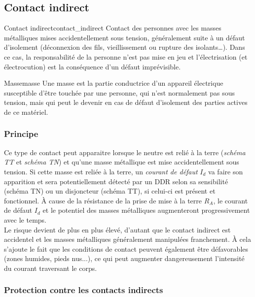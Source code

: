 \documentclass[a4paper, 11pt, twoside, fleqn]{memoir}
\begin{document}
\subsection{Contact indirect}

\begin{definition}{Contact indirect}{contact_indirect}
Contact des personnes avec les masses métalliques mises accidentellement sous tension, généralement suite à un défaut d'isolement (déconnexion des fils, vieillissement ou rupture des isolants\ldots). Dans ce cas, la responsabilité de la personne n'est pas mise en jeu et l'électrisation (et électrocution) est la conséquence d'un défaut imprévisible.
\end{definition}
\begin{definition}{Masse}{masse}
Une masse est la partie conductrice d'un appareil électrique susceptible d'être touchée par une personne, qui n'est normalement pas sous tension, mais qui peut le devenir en cas de défaut d'isolement des parties actives de ce matériel.
\end{definition}

\subsubsection{Principe}



Ce type de contact peut apparaitre lorsque le neutre est relié à la terre (\emph{schéma TT} et \emph{schéma TN}) et qu'une masse métallique est mise accidentellement sous tension. Si cette masse est reliée à la terre, un \emph{courant de défaut} \(I_d\) va faire son apparition et sera potentiellement détecté par un DDR selon sa sensibilité (schéma TN) ou un disjoncteur (schéma TT), si celui-ci est présent et fonctionnel. \`A cause de la résistance de la prise de mise à la terre \(R_A\), le courant de défaut \(I_d\) et le potentiel des masses métalliques augmenteront progressivement avec le temps.\\

Le risque devient de plus en plus élevé, d'autant que le contact indirect est accidentel et les masses métalliques généralement manipulées franchement. \`A cela s'ajoute le fait que les conditions de contact peuvent également être défavorables (zones humides, pieds nus...), ce qui peut augmenter dangereusement l'intensité du courant traversant le corps.

\subsubsection{Protection contre les contacts indirects}
\end{document}
